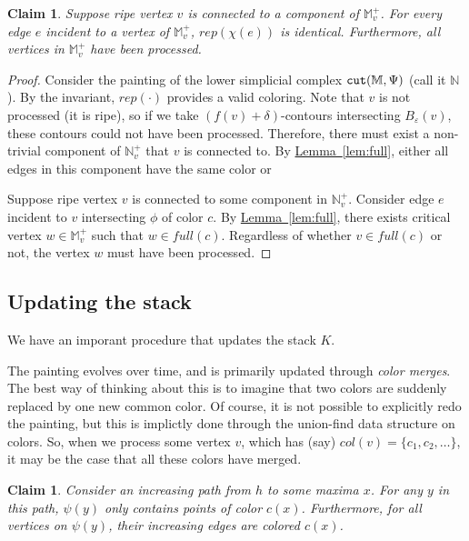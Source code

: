 \documentclass[11pt]{article}
\newtheorem{claim}[theorem]{Claim}
\theoremstyle{definition}
\newcommand{\MM}{\mathbb{M}}
\newcommand{\NN}{\mathbb{N}}
\newcommand{\eps}{\varepsilon}
\newcommand{\Lem}[1]{\hyperref[lem:#1]{Lemma~\ref*{lem:#1}}} %
\newcommand{\col}{col}
\newcommand{\fcol}{full}
\newcommand{\cut}{{\tt cut}}
\newcommand{\cont}{\psi}
\newcommand{\rep}{rep}
\newcommand{\st}{K}
\begin{document}
{\begin{claim}
Suppose ripe vertex $v$ is connected to a component of $\MM^+_v$. For every edge $e$ incident to a vertex of $\MM^+_v$,
$\rep(\chi(e))$ is identical. Furthermore, all vertices in $\MM^+_v$ have been processed.
\end{claim}

\begin{proof} Consider the painting of the lower simplicial complex $\cut(\MM,\Psi)$ (call it $\NN$). 
By the invariant, $\rep(\cdot)$ provides a valid coloring. Note that $v$ is not processed (it is ripe),
so if we take $(f(v)+\delta)$-contours intersecting $B_\eps(v)$, these contours could not have been
processed. Therefore, there must exist a non-trivial component of $\NN^+_v$ that $v$
is connected to. By \Lem{full}, either all edges in this component have the same color
or 


Suppose ripe vertex $v$
is connected to some component in $\NN^+_v$. 
Consider edge $e$ incident to $v$ intersecting $\phi$ of color $c$. 
By \Lem{full}, there exists critical vertex $w \in \MM^+_v$ such that $w \in \fcol(c)$. 
Regardless of whether $v \in \fcol(c)$ or not, the vertex $w$ must have been processed. 

\end{proof}

\subsection{Updating the stack} \label{sec:stack}

We have an imporant procedure that updates the stack $\st$.




The painting evolves over time, and is primarily updated through \emph{color merges}. The best way
of thinking about this is to imagine that two colors are suddenly replaced by one new common color.
Of course, it is not possible to explicitly redo the painting, but this is implictly done
through the union-find data structure on colors. So, when we process some vertex $v$,
which has (say) $\col(v) = \{c_1, c_2, \ldots\}$, it may be the case that all these colors
have merged.



\begin{claim} \label{clm:cont} Consider an increasing path from $h$ to some maxima $x$.
For any $y$ in this path, $\cont(y)$ only contains points of color $c(x)$.
Furthermore, for all vertices on $\cont(y)$, their increasing edges are colored $c(x)$.
\end{claim}

}
\end{document}

